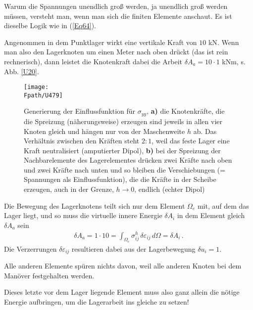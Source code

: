 {Warum die Spannungen unendlich gro{\ss} werden, ja unendlich gro{\ss} werden m\"{u}ssen, versteht man, wenn man sich die finiten Elemente anschaut. Es ist dieselbe Logik wie in (\ref{Eq64}).

Angenommen in dem Punktlager wirkt eine vertikale Kraft von $10 $ kN. Wenn man also den Lagerknoten um einen Meter nach oben dr\"{u}ckt (das ist rein rechnerisch), dann leistet die Knotenkraft dabei die Arbeit $\delta A_a =10 \cdot 1$ kNm, s. Abb. \ref{U20}.
\begin{figure}
\centering
\if {} \sidecaption[t] \fi
{\texttt{[image: \\Fpath/U479]}}
\caption{Generierung der Einflussfunktion f\"{u}r $\sigma_{yy}$, \textbf{ a)} die Knotenkr\"{a}fte, die die Spreizung (n\"{a}herungsweise) erzeugen sind jeweils in allen vier Knoten gleich und h\"{a}ngen nur von der Maschenweite $h$ ab. Das Verh\"{a}ltnis zwischen den Kr\"{a}ften steht $2:1$, weil das feste Lager eine Kraft neutralisiert (\glq amputierter Dipol\grq), \textbf{ b)} bei der Spreizung der Nachbarelemente des Lagerelementes dr\"{u}cken zwei Kr\"{a}fte nach oben und zwei Kr\"{a}fte nach unten und so bleiben die  Verschiebungen (= Spannungen als Einflussfunktion), die die Kr\"{a}fte in der Scheibe erzeugen, auch in der Grenze, $h \to 0$, endlich (\glq echter Dipol\grq)}
\label{U479}%
\end{figure}%


Die Bewegung des Lagerknotens teilt sich nur dem Element $\Omega_e$ mit, auf dem das Lager liegt, und so muss die virtuelle innere Energie $\delta A_i$ in dem Element gleich $\delta A_a$ sein
\begin{align}\label{Eq16}
\delta A_a = 1\cdot 10 = \int_{\Omega_e} \sigma_{ij}^h\,\delta \varepsilon_{ij}\,d\Omega = \delta A_i\,.
\end{align}
Die Verzerrungen $\delta \varepsilon_{ij}$ resultieren dabei aus der Lagerbewegung $\delta u_i = 1$.

Alle anderen Elemente sp\"{u}ren nichts davon, weil alle anderen Knoten bei dem Man\"{o}ver festgehalten werden. \\

\hspace*{-12pt}\colorbox{highlightBlue}{\parbox{0.98\textwidth}{Dieses letzte vor dem Lager liegende Element muss also ganz allein die n\"{o}tige Energie aufbringen, um die Lagerarbeit ins gleiche zu setzen!}}\\

}
